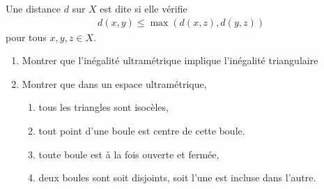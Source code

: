 \documentclass[french,a4paper,10pt]{article}
\begin{document}
	\begin{td-exo}
		Une distance $d$ sur $X$ est dite  si elle vérifie
			\[\begin{aligned}
				d(x,y)\le \max(d(x,z),d(y,z))
			\end{aligned}\]
		pour tous $x,y,z\in X$.
			\begin{enumerate}
				\item Montrer que l'inégalité ultramétrique implique l'inégalité triangulaire
				
				\item Montrer que dans un espace ultramétrique, 
				\begin{enumerate}
					\item tous les triangles sont isocèles,
					
					\item tout point d'une boule est centre de cette boule.
					
					\item toute boule est à la fois ouverte et fermée,
					
					\item deux boules sont soit disjoints, soit l'une est incluse dans l'autre.
				\end{enumerate}
			\end{enumerate}
	\end{td-exo}
\end{document}
